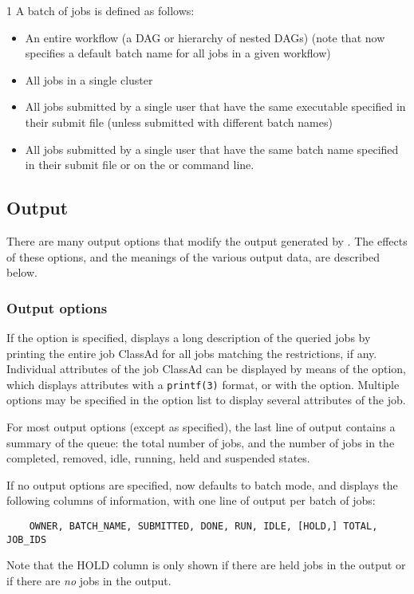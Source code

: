 \begin{ManPage}{\label{man-condor-q}}{1}
A batch of jobs is defined as follows:
    \begin{itemize}
    \item An entire workflow (a DAG or hierarchy of nested DAGs)
      (note that  now specifies a default batch
      name for all jobs in a given workflow)
    \item All jobs in a single cluster
    \item All jobs submitted by a single user that have the same
      executable specified in their submit file (unless submitted
      with different batch names)
    \item All jobs submitted by a single user that have the same
      batch name specified in their submit file or on the 
      or  command line.
    \end{itemize}

\subsection*{Output}

There are many output options that modify the output generated by
.  The effects of these options, and the meanings of the
various output data, are described below.

\subsubsection*{Output options}
If the  option is specified,  displays a long description 
of the queried jobs by printing the entire job ClassAd for all jobs
matching the restrictions, if any.
Individual attributes of the job ClassAd can be displayed by means of the
 option, which displays attributes with a \verb+printf(3)+
format, or with the  option.
Multiple  options may be specified in the option list to display
several attributes of the job.

For most output options (except as specified), the last line of
 output contains a summary of the queue: the total
number of jobs, and the number of jobs in the completed, removed,
idle, running, held and suspended states.

If no output options are specified,  now defaults to
batch mode, and displays the following columns of information, with
one line of output per batch of jobs:
\begin{verbatim}
    OWNER, BATCH_NAME, SUBMITTED, DONE, RUN, IDLE, [HOLD,] TOTAL, JOB_IDS
\end{verbatim}
Note that the HOLD column is only shown if there are held jobs in
the output or if there are \emph{no} jobs in the output.


\end{ManPage}
